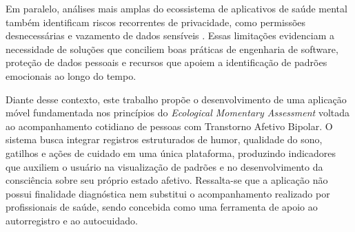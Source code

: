 Em paralelo, análises mais amplas do ecossistema de aplicativos de
saúde mental também identificam riscos recorrentes de privacidade,
como permissões desnecessárias e vazamento de dados sensíveis \citep{Iwaya:22}.
Essas limitações evidenciam a necessidade de soluções que conciliem
boas práticas de engenharia de software, proteção de dados pessoais e
recursos que apoiem a identificação de padrões emocionais ao longo do tempo.

Diante desse contexto, este trabalho propõe o desenvolvimento de uma
aplicação móvel fundamentada nos princípios do
\textit{Ecological Momentary Assessment} voltada ao acompanhamento
cotidiano de pessoas com Transtorno Afetivo Bipolar. O sistema busca
integrar registros estruturados de humor, qualidade do sono, gatilhos
e ações de cuidado em uma única plataforma, produzindo indicadores que
auxiliem o usuário na visualização de padrões e no desenvolvimento da
consciência sobre seu próprio estado afetivo. Ressalta-se que a aplicação
não possui finalidade diagnóstica nem substitui o acompanhamento realizado
por profissionais de saúde, sendo concebida como uma ferramenta de apoio
ao autorregistro e ao autocuidado.

